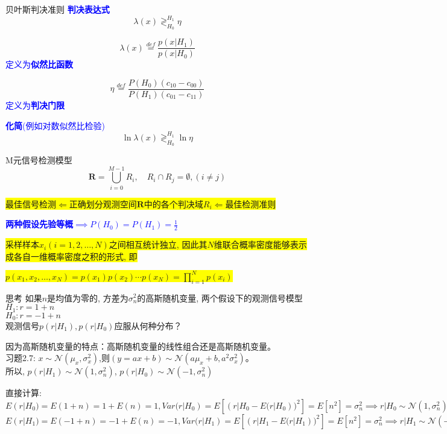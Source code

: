 \begin{frame}{贝叶斯判决准则}
\textcolor{blue}{\textbf{判决表达式}}
\[
\lambda(x)\mathop{\gtrless}_{H_0}^{H_1}\eta
\]

\[ \lambda(x)\mathop{=}\limits^{def}\frac{p(x|H_1)}{p(x|H_0)} \] \textcolor{blue}{定义为\textbf{似然比函数}}

\bigskip
\[\eta\mathop{=}\limits^{def}\frac{P(H_0)(c_{10}-c_{00})}{P(H_1)(c_{01}-c_{11})} \] \textcolor{blue}{定义为\textbf{判决门限}}

\bigskip
\textcolor{blue}{\textbf{化简}(例如对数似然比检验)}
\[
\ln\lambda(x)\mathop{\gtrless}_{H_0}^{H_1}\ln\eta
\]

\end{frame}

\begin{frame}{M元信号检测模型}
\[\bm{R}=\bigcup\limits_{i=0}^{M-1}R_i, \quad R_i\cap R_j=\emptyset,(i\ne j) \]

\bigskip

\colorbox{yellow}{最佳信号检测$\Leftarrow$正确划分观测空间$\bm{R}$中的各个判决域$R_i\Leftarrow$最佳检测准则} 

\bigskip

\textcolor{blue}{\textbf{两种假设先验等概$\implies P(H_0)=P(H_1)=\frac{1}{2}$}}

\bigskip


\tiny{
\colorbox{yellow}{采样样本$x_i(i=1,2,\dots,N)$之间相互统计独立, 因此其$N$维联合概率密度能够表示成各自一维概率密度之积的形式, 即}\\
}

\colorbox{yellow}{$p(x_1,x_2,\dots,x_N)=p(x_1)p(x_2)\cdots p(x_N)=\prod\limits_{i=1}^Np(x_i)$} 
\end{frame}

\begin{frame}[shrink]
\begin{block}{思考}
	如果$n$是均值为零的, 方差为$\sigma_n^2$的高斯随机变量, 两个假设下的观测信号模型\\
	$H_1: r=1+n$\\
	$H_0: r=-1+n$\\
	观测信号$p(r|H_1),p(r|H_0)$应服从何种分布？
\end{block}
\begin{block}{}
	因为高斯随机变量的特点：高斯随机变量的线性组合还是高斯随机变量。\\
	习题2.7: $x\sim\mathcal{N}(\mu_x,\sigma_x^2)$,则$(y=ax+b)\sim\mathcal{N}(a\mu_x+b,a^2\sigma_x^2)$。\\
	所以, $p(r|H_1)\sim\mathcal{N}(1,\sigma_n^2)$, $p(r|H_0)\sim\mathcal{N}(-1,\sigma_n^2)$
\end{block}
\begin{block}{}
	直接计算: $E(r|H_0)=E(1+n)=1+E(n)=1,Var(r|H_0)=E[(r|H_0-E(r|H_0))^2]=E[n^2]=\sigma_n^2\implies r|H_0\sim\mathcal{N}(1,\sigma_n^2)$\\
	$E(r|H_1)=E(-1+n)=-1+E(n)=-1,Var(r|H_1)=E[(r|H_1-E(r|H_1))^2]=E[n^2]=\sigma_n^2\implies r|H_1\sim\mathcal{N}(-1,\sigma_n^2)$
\end{block}
\end{frame}

